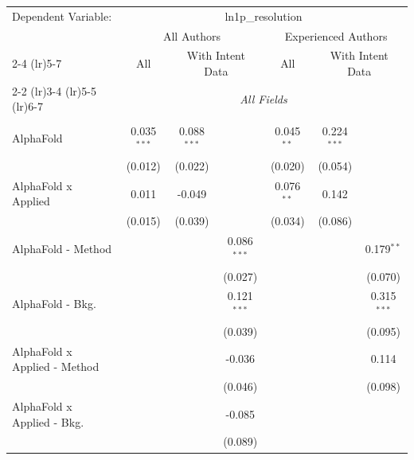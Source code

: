 \begingroup
\centering
\begin{tabular}{lcccccc}
   \tabularnewline \midrule \midrule
   Dependent Variable: & \multicolumn{6}{c}{ln1p\_resolution}\\
 & \multicolumn{3}{c}{All Authors} & \multicolumn{3}{c}{Experienced Authors} \\
\cmidrule(lr){2-4} \cmidrule(lr){5-7}
 & \multicolumn{1}{c}{All} & \multicolumn{2}{c}{With Intent Data} & \multicolumn{1}{c}{All} & \multicolumn{2}{c}{With Intent Data} \\
\cmidrule(lr){2-2} \cmidrule(lr){3-4} \cmidrule(lr){5-5} \cmidrule(lr){6-7}
 & \multicolumn{6}{c}{\textit{All Fields}} \\ \\
   AlphaFold                      & 0.035$^{***}$ & 0.088$^{***}$ &               & 0.045$^{**}$ & 0.224$^{***}$ &   \\   
                                  & (0.012)       & (0.022)       &               & (0.020)      & (0.054)       &   \\   
   AlphaFold x Applied            & 0.011         & -0.049        &               & 0.076$^{**}$ & 0.142         &   \\   
                                  & (0.015)       & (0.039)       &               & (0.034)      & (0.086)       &   \\   
   AlphaFold - Method             &               &               & 0.086$^{***}$ &              &               & 0.179$^{**}$\\   
                                  &               &               & (0.027)       &              &               & (0.070)\\   
   AlphaFold - Bkg.               &               &               & 0.121$^{***}$ &              &               & 0.315$^{***}$\\   
                                  &               &               & (0.039)       &              &               & (0.095)\\   
   AlphaFold x Applied - Method   &               &               & -0.036        &              &               & 0.114\\   
                                  &               &               & (0.046)       &              &               & (0.098)\\   
   AlphaFold x Applied - Bkg.     &               &               & -0.085        &              &               &   \\   
                                  &               &               & (0.089)       &              &               &   \\   

\end{tabular}
